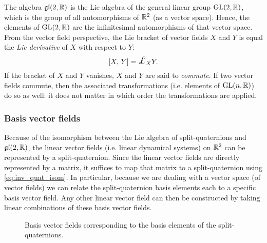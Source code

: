 The algebra $\mathfrak{gl}(2, \mathbb{R})$ is the Lie algebra of the general linear group $\mathrm{GL}(2, \mathbb{R})$, which is the group of all automorphisms of $\mathbb{R}^2$ (as a vector space). Hence, the elements of $\mathrm{GL}(2, \mathbb{R})$ are the infinitesimal automorphisms of that vector space. From the vector field perspective, the Lie bracket of vector fields $X$ and $Y$ is equal the \emph{Lie derivative} of $X$ with respect to $Y$:
\begin{equation}
    \liebr{X}{Y} = \lied{X}{Y}.
\end{equation}
If the bracket of $X$ and $Y$ vanishes, $X$ and $Y$ are said to \emph{commute}. If two vector fields commute, then the associated transformations (i.e. elements of $\mathrm{GL}(n, \mathbb{R})$) do so as well: it does not matter in which order the transformations are applied.

\subsubsection{Basis vector fields}
Because of the isomorphism between the Lie algebra of split-quaternions and $\mathfrak{gl}(2, \mathbb{R})$, the linear vector fields (i.e. linear dynamical systems) on $\mathbb{R}^2$ can be represented by a split-quaternion. Since the linear vector fields are directly represented by a matrix, it suffices to map that matrix to a split-quaternion using \cref{eq:inv_quat_isom}. In particular, because we are dealing with a vector space (of vector fields) we can relate the split-quaternion basis elements each to a specific basis vector field. Any other linear vector field can then be constructed by taking linear combinations of these basis vector fields. 

\begin{figure}[ht!]
    \centering
    
    \caption{Basis vector fields corresponding to the basis elements of the split-quaternions.}
    \label{fig:basis_vf}
\end{figure}

